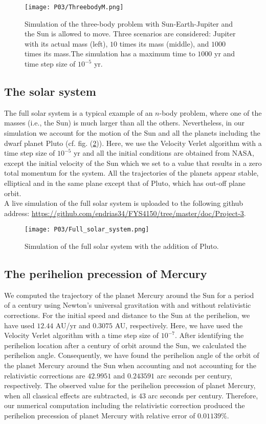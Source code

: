 \documentclass[a4paper]{article}
\begin{document}
\begin{figure}
  \centering
  \texttt{[image: P03/ThreebodyM.png]}
  \caption{Simulation of the three-body problem with Sun-Earth-Jupiter and the Sun is allowed to move. Three scenarios are considered: Jupiter with its actual mass (left), $10$ times its mass (middle), and $1000$ times its mass.The simulation has a maximum time to $1000$ yr and time step size of $10^{-5}$ yr.}
   \label{ThreebodyM}
\end{figure}

\subsection{The solar system}
The full solar system is a typical example of an $n$-body problem, where one of the masses (i.e., the Sun) is much larger than all the others. Nevertheless, in our simulation we account for the motion of the Sun and all the planets including the dwarf planet Pluto (cf. fig. (\ref{Full_solar_system})). Here, we use the Velocity Verlet algorithm with a time step size of $10^{-5}$ yr and all the initial conditions are obtained from NASA, except the initial velocity of the Sun which we set to a value that results in a zero total momentum for the system. All the trajectories of the planets appear stable, elliptical and in the same plane except that of Pluto, which has out-off plane orbit. \\

A live simulation of the full solar system is uploaded to the following github address: \url{https://github.com/endrias34/FYS4150/tree/master/doc/Project-3}.

\begin{figure}
  \centering
  \texttt{[image: P03/Full\_solar\_system.png]}
  \caption{Simulation of the full solar system with the addition of Pluto.}
   \label{Full_solar_system}
\end{figure}

\subsection{The perihelion precession of Mercury}
We computed the trajectory of the planet Mercury around the Sun for a period of a century using Newton's universal gravitation with and without relativistic corrections. For the initial speed and distance to the Sun at the perihelion, we have used $12.44$ AU/yr and $0.3075$ AU, respectively. Here, we have used the Velocity Verlet algorithm with a time step size of $10^{-7}$. After identifying the perihelion location after a century of orbit around the Sun, we calculated the perihelion angle. Consequently, we have found the perihelion angle of the orbit of the planet Mercury around the Sun when accounting and not accounting for the relativistic corrections are $42.9951$ and $0.243591$ arc seconds per century, respectively. The observed value for the perihelion precession of planet Mercury, when all classical effects are subtracted, is $43$ arc seconds per century. Therefore, our numerical computation including the relativistic correction produced the perihelion precession of planet Mercury with relative error of $0.01139\%$.
\end{document}
